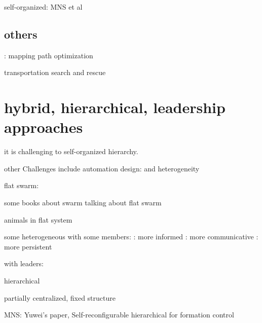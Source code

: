 self-organized: 
MNS et al
\cite{jamshidpey2020multi}
\cite{jamshidpey2023reducing}
\cite{mathews2017mergeable}
\cite{zhang2023self}
\cite{zhu2020formation}
\cite{zhu2024self}

\subsection{others}:
\cite{howard2006multi} mapping
\cite{psaraftis2016dynamic} path optimization

\cite{tuci2018cooperative} transportation
\cite{robin2016multi} search and rescue

\section{hybrid, hierarchical, leadership approaches}

\cite{dorigo2020reflections} it is challenging to self-organized hierarchy.

other Challenges include automation design:
\cite{francesca2016automatic}
\cite{birattari2019automatic}
\cite{salman2024automatic}
and heterogeneity 
\cite{kengyel2015potential}

flat swarm:
\cite{viragh2014flocking}
\cite{vasarhelyi2018optimized}

some books about swarm talking about flat swarm
\cite{beni1988concept}
\cite{bonabeau1999swarm}
\cite{csahin2004swarm}
\cite{floreano2008bio}

animals in flat system
\cite{buhl2006disorder}
\cite{detrain2008collective}
\cite{theraulaz1998origin}

some heterogeneous with some members:
\cite{firat2020self} : more informed 
\cite{valentini2016collective} : more communicative
\cite{balazs2020adaptive} : more persistent

with leaders:
\cite{gu2009leader}
\cite{amraii2014explicit}
\cite{zheng2020adversarial}
\cite{shan2020collective}
\cite{kaiser2022innate}

hierarchical
\cite{dalmao2011cucker}
\cite{pignotti2018flocking}
\cite{jia2019modelling}
\cite{divband2019photomorphogenesis}

\cite{zhou2022swarm} partially centralized, fixed structure

MNS:
\cite{mathews2017mergeable}
\cite{zhu2020formation}
\cite{zhang2023self} Yuwei's paper, Self-reconfigurable hierarchical for formation control
\cite{jamshidpey2020multi}
\cite{jamshidpey2024centralization}
\cite{jamshidpey2023reducing}

